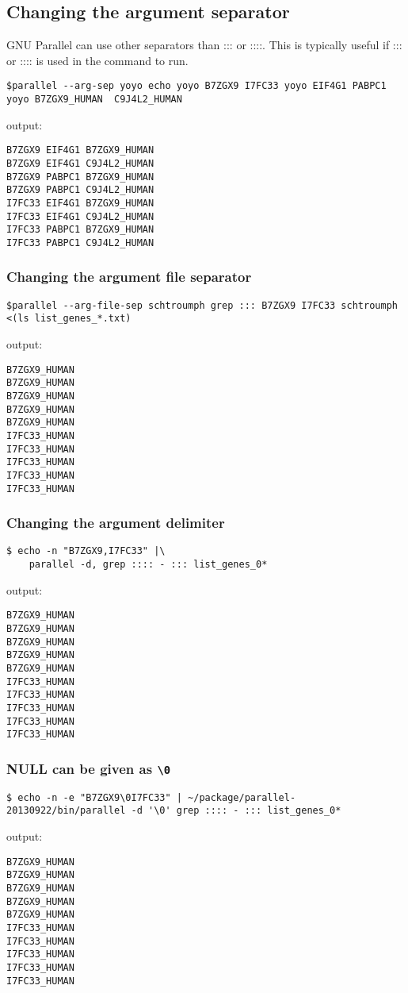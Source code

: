 \documentclass{article}
\begin{document}
\subsection{Changing the argument separator}
GNU Parallel can use other separators than ::: or ::::. This is typically useful if ::: or :::: is used in the command to run.
\begin{lstlisting}
$parallel --arg-sep yoyo echo yoyo B7ZGX9 I7FC33 yoyo EIF4G1 PABPC1 yoyo B7ZGX9_HUMAN  C9J4L2_HUMAN
\end{lstlisting}
output:
\begin{lstlisting}
B7ZGX9 EIF4G1 B7ZGX9_HUMAN
B7ZGX9 EIF4G1 C9J4L2_HUMAN
B7ZGX9 PABPC1 B7ZGX9_HUMAN
B7ZGX9 PABPC1 C9J4L2_HUMAN
I7FC33 EIF4G1 B7ZGX9_HUMAN
I7FC33 EIF4G1 C9J4L2_HUMAN
I7FC33 PABPC1 B7ZGX9_HUMAN
I7FC33 PABPC1 C9J4L2_HUMAN
\end{lstlisting}
\subsubsection{Changing the argument file separator}
\begin{lstlisting}
$parallel --arg-file-sep schtroumph grep ::: B7ZGX9 I7FC33 schtroumph  <(ls list_genes_*.txt)
\end{lstlisting}
output:
\begin{lstlisting}
B7ZGX9_HUMAN
B7ZGX9_HUMAN
B7ZGX9_HUMAN
B7ZGX9_HUMAN
B7ZGX9_HUMAN
I7FC33_HUMAN
I7FC33_HUMAN
I7FC33_HUMAN
I7FC33_HUMAN
I7FC33_HUMAN
\end{lstlisting}
\subsubsection{Changing the argument delimiter}
\begin{lstlisting}
$ echo -n "B7ZGX9,I7FC33" |\
	parallel -d, grep :::: - ::: list_genes_0*
\end{lstlisting}
output:
\begin{lstlisting}
B7ZGX9_HUMAN
B7ZGX9_HUMAN
B7ZGX9_HUMAN
B7ZGX9_HUMAN
B7ZGX9_HUMAN
I7FC33_HUMAN
I7FC33_HUMAN
I7FC33_HUMAN
I7FC33_HUMAN
I7FC33_HUMAN
\end{lstlisting}

\subsubsection{NULL can be given as  \texttt{\textbackslash{}0}}
\begin{lstlisting}
$ echo -n -e "B7ZGX9\0I7FC33" | ~/package/parallel-20130922/bin/parallel -d '\0' grep :::: - ::: list_genes_0*
\end{lstlisting}
output:
\begin{lstlisting}
B7ZGX9_HUMAN
B7ZGX9_HUMAN
B7ZGX9_HUMAN
B7ZGX9_HUMAN
B7ZGX9_HUMAN
I7FC33_HUMAN
I7FC33_HUMAN
I7FC33_HUMAN
I7FC33_HUMAN
I7FC33_HUMAN
\end{lstlisting}
\end{document}

